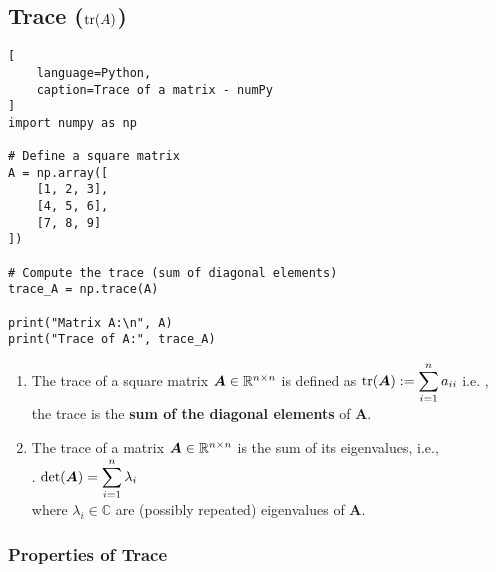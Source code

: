 \subsection{Trace ($\text{tr}(A)$)}


\begin{lstlisting}[
    language=Python,
    caption=Trace of a matrix - numPy
]
import numpy as np

# Define a square matrix
A = np.array([
    [1, 2, 3],
    [4, 5, 6],
    [7, 8, 9]
])

# Compute the trace (sum of diagonal elements)
trace_A = np.trace(A)

print("Matrix A:\n", A)
print("Trace of A:", trace_A)
\end{lstlisting}

\begin{enumerate}
    \item
    \begin{definition}[Trace]
        The trace of a square matrix $\bm{A} \in \mathbb{R}^{n\times n}$ is defined as $\text{tr}(\bm{A}) := \displaystyle\sum^n _{i=1} a_{ii}$ i.e. , the trace is the \textbf{sum of the diagonal elements} of $\bm{A}$.
        \hfill \cite{mfml/book/mml/Deisenroth-Faisal-Ong}
    \end{definition}

    \item
    \begin{theorem}
        The trace of a matrix $\bm{A} \in \mathbb{R}^{n\times n}$ is the sum of its eigenvalues, i.e.,
        \hfill \cite{mfml/book/mml/Deisenroth-Faisal-Ong}
        \\
        .\hfill
        $
            \det(\bm{A}) = \displaystyle\sum_{i=1}^{n} \lambda_i
        $
        \hfill \cite{mfml/book/mml/Deisenroth-Faisal-Ong}
        \\
        where $\lambda_i \in \mathbb{C}$ are (possibly repeated) eigenvalues of $\bm{A}$.
        \hfill \cite{mfml/book/mml/Deisenroth-Faisal-Ong}
    \end{theorem}
\end{enumerate}


\subsubsection{Properties of Trace}

